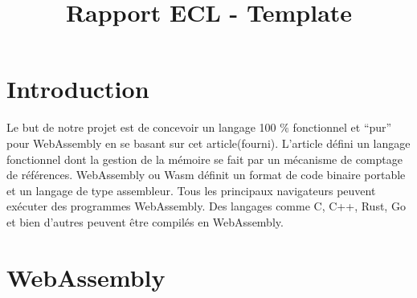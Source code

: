 \documentclass{rapportECL}
\title{Rapport ECL - Template} %
\begin{document}





\fairemarges %
\fairepagedegarde %
\tabledematieres %

\section{Introduction}
Le but de notre projet est de concevoir un langage 100 $\%$ fonctionnel et “pur” pour WebAssembly en 
se basant sur cet article\cite{ullrich_counting_2020}(fourni). L'article défini un langage fonctionnel dont la gestion de la mémoire se fait par 
un mécanisme de comptage de références.
WebAssembly\cite{noauthor_webassembly_nodate} ou Wasm définit un format de code binaire portable
et un langage de type assembleur\cite{noauthor_webassembly_2023}. Tous les principaux navigateurs peuvent exécuter des programmes WebAssembly. 
Des langages comme C, C++, Rust, Go et bien d'autres peuvent être compilés en WebAssembly. 

\section{WebAssembly}
\end{document}
